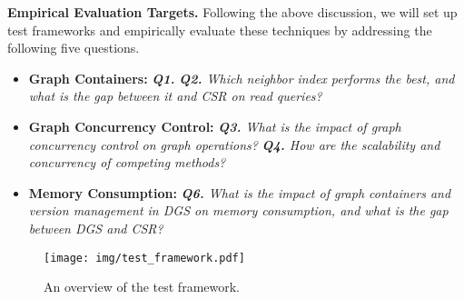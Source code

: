 \vspace{2pt}
\noindent\textbf{Empirical Evaluation Targets.} Following the above discussion, we will set up test frameworks and empirically evaluate these techniques by addressing the following five questions.

\begin{itemize} [leftmargin=*]
    \item \textbf{Graph Containers:} \emph{\textbf{Q1.} } \emph{\textbf{Q2.} Which neighbor index performs the best, and what is the gap between it and CSR on read queries?}
    \item \textbf{Graph Concurrency Control:} \emph{\textbf{Q3.} What is the impact of graph concurrency control on graph operations?} \emph{\textbf{Q4.} How are the scalability and concurrency of competing methods?}
    \item \textbf{Memory Consumption:} \emph{\textbf{Q6.} What is the impact of graph containers and version management in DGS on memory consumption, and what is the gap between DGS and CSR?}
\end{itemize}

\begin{figure*}[t]\small
    \setlength{\abovecaptionskip}{0pt}
    \texttt{[image: img/test\_framework.pdf]}
    \centering
    \caption{An overview of the test framework.}
    \label{fig:overview_test_framework}
\end{figure*}

